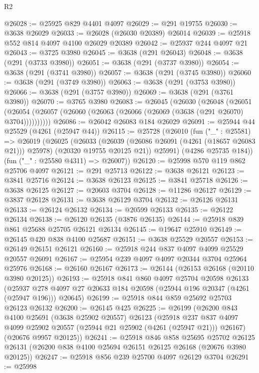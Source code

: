 \begin{lexlean}{R2}
\begin{coremodule}
@26028 := @25925 @829 @4401 @4097
@26029 := @291 @19755
@26030 := @3638 @26029
@26033 := @26028 (@26030 @20389) @26014
@26039 := @25918 @552 @814 @4097 @4100 @26029 @20389
@26042 := @25937 @244 @4097 @21
@26043 := @3725 @3980
@26045 := @3638 (@291 @26043)
@26048 := @3638 (@291 (@3733 @3980))
@26051 := @3638 (@291 (@3737 @3980))
@26054 := @3638 (@291 (@3741 @3980))
@26057 := @3638 (@291 (@3745 @3980))
@26060 := @3638 (@291 (@3749 @3980))
@26063 := @3638 (@291 (@3753 @3980))
@26066 := @3638 (@291 (@3757 @3980))
@26069 := @3638 (@291 (@3761 @3980))
@26070 := @3765 @3980
@26083 := @26045
    (@26030
      (@26048
        (@26051 (@26054 (@26057 (@26060 (@26063 (@26066 (@26069 (@3638 (@291 @26070) @3704))))))))))
@26086 := @26042 @26083 @184 @26029
@26091 := @25944 @44 @25529 (@4261 (@25947 @44))
@26115 := @25728
    (@26010
      (fun ("_" : @25581) =>
      @26019
        (@26025
          (@26033
            (@26039 (@26086 @26091 (@4261 (@18657 @26083 @21))) @25978)
            (@20320 @19755 @20125 @21))
          @25991)
        (@4286 @25735 @184))
      (fun ("_" : @25580 @4311) => @26007))
@26120 := @25998 @570 @119 @862 @25706 @4097
@26121 := @291 @25713
@26122 := @3638 @26121
@26123 := @3841 @25716
@26124 := @3638 @26123
@26125 := @3841 @25718
@26126 := @3638 @26125
@26127 := @20603 @3704
@26128 := @11286 @26127
@26129 := @3837 @26128
@26131 := @3638 @26129 @3704
@26132 := @26126 @26131
@26133 := @26124 @26132
@26134 := @20599 @26133
@26135 := @26122 @26134
@26138 := @26120 @26135 (@3876 @26135)
@26144 := @25918 @839 @861 @25688 @25705 @26121 @26134
@26145 := @19647 @25910
@26149 := @26145 @420 @838 @4100 @25687
@26151 := @3638 @25529 @20557
@26153 := @26149 @26151 @26121
@26160 := @25918 @244 @837 @4097 @4099 @25529 @20557 @26091
@26167 := @25954 @239 @4097 @4097 @20344 @3704 @25964 @25976
@26168 := @26160 @26167
@26173 := @26144 (@26153 @26168 (@20110 @3980 @20125))
@26193 := @25918
    @841
    @860
    @4097
    @25704
    @20598
    @26133
    (@25937 @278 @4097 @27 @20633 @184 @20598 (@25944 @196 @20347 (@4261 (@25947 @196))) @20645)
@26199 := @25918 @844 @859 @25692 @25703 @26123 @26132
@26200 := @26145 @425
@26225 := @26199
    (@26200
      @843
      @4100
      @25691
      (@3638 @25902 @20557)
      @26123
      (@25918 @237 @837 @4097 @4099 @25902 @20557 (@25944 @21 @25902 (@4261 (@25947 @21))) @26167)
      (@20676 @9957 @20125))
@26241 := @25918
    @846
    @858
    @25695
    @25702
    @26125
    @26131
    (@26200 @838 @4100 @25694 @26151 @26125 @26168 (@20676 @3980 @20125))
@26247 := @25918 @856 @239 @25700 @4097 @26129 @3704
@26291 := @25998

\end{coremodule}
\end{lexlean}
